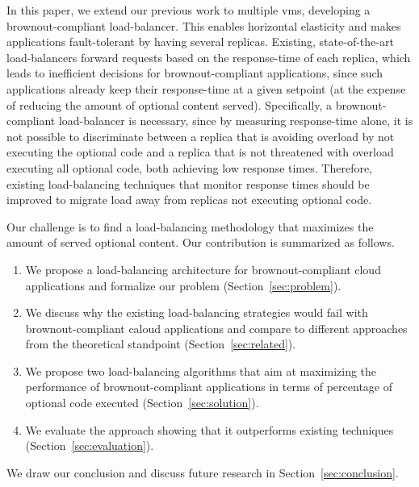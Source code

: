 In this paper, we extend our previous work to multiple \acp{vm},
developing a brownout-compliant load-balancer. This enables horizontal
elasticity and makes applications fault-tolerant by having several
replicas. Existing, state-of-the-art load-balancers forward requests
based on the response-time of each replica, which leads to inefficient
decisions for brownout-compliant applications, since such applications
already keep their response-time at a given setpoint (at the expense
of reducing the amount of optional content served). Specifically, a
brownout-compliant load-balancer is necessary, since by measuring
response-time alone, it is not possible to discriminate between a
replica that is avoiding overload by not executing the optional code
and a replica that is not threatened with overload executing all
optional code, both achieving low response times.  Therefore, existing
load-balancing techniques that monitor response times should be
improved to migrate load away from replicas not executing optional
code.

Our challenge is to find a load-balancing methodology that maximizes
the amount of served optional content. Our contribution is summarized
as follows.
\begin{enumerate}
\item We propose a load-balancing architecture for brownout-compliant
  cloud applications and formalize our problem
  (Section~\ref{sec:problem}).
\item We discuss why the existing load-balancing strategies would fail
  with brownout-compliant caloud applications and compare to different
  approaches from the theoretical standpoint
  (Section~\ref{sec:related}).
\item We propose two load-balancing algorithms that aim at maximizing
  the performance of brownout-compliant applications in terms of
  percentage of optional code executed (Section~\ref{sec:solution}).
\item We evaluate the approach showing that it outperforms existing
  techniques (Section~\ref{sec:evaluation}).
\end{enumerate}
We draw our conclusion and discuss future research in
Section~\ref{sec:conclusion}.
